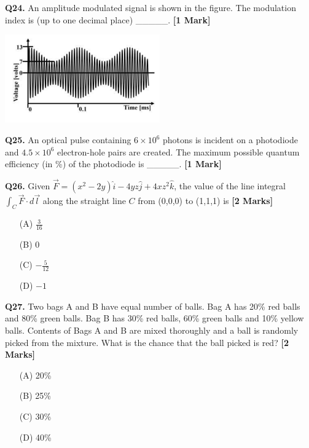 \documentclass[11pt]{article}
\newcommand{\questiona}[2]{
    \noindent\textbf{Q#2.} #1 \hfill \textbf{[1 Mark]}
}
\newcommand{\questionb}[2]{
    \noindent\textbf{Q#2.} #1 \hfill \textbf{[2 Marks]}
}
\begin{document}
\questiona{An amplitude modulated signal is shown in the figure. The modulation index is (up to one decimal place) \_\_\_\_\_.}{24}
\begin{center}
\includegraphics[width=0.5\textwidth]{figures/24.png}
\end{center}
\vspace{0.5cm}

\questiona{An optical pulse containing \(6 \times 10^6\) photons is incident on a photodiode and \(4.5 \times 10^6\) electron-hole pairs are created. The maximum possible quantum efficiency (in \%) of the photodiode is \_\_\_\_\_.}{25}
\vspace{0.5cm}

\questionb{Given \(\vec{F} = (x^2 - 2y)\hat{i} - 4yz\hat{j} + 4xz^2\hat{k}\), the value of the line integral \(\int_C \vec{F} \cdot d\vec{l}\) along the straight line \(C\) from (0,0,0) to (1,1,1) is}{26}
\begin{enumerate}
    \item[(A)] \(\frac{3}{16}\)
    \item[(B)] 0
    \item[(C)] \(-\frac{5}{12}\)
    \item[(D)] \(-1\)
\end{enumerate}
\vspace{0.5cm}

\questionb{Two bags A and B have equal number of balls. Bag A has 20\% red balls and 80\% green balls. Bag B has 30\% red balls, 60\% green balls and 10\% yellow balls. Contents of Bags A and B are mixed thoroughly and a ball is randomly picked from the mixture. What is the chance that the ball picked is red?}{27}
\begin{enumerate}
    \item[(A)] 20\%
    \item[(B)] 25\%
    \item[(C)] 30\%
    \item[(D)] 40\%
\end{enumerate}
\vspace{0.5cm}
\end{document}
